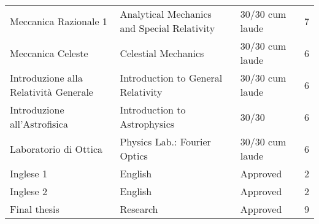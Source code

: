 \documentclass[a4paper,10pt,notitlepage]{paper}
\begin{document}
{\begin{tabular*}{\linewidth}{lll@{\hspace{0.7cm}}l@{\extracolsep{\fill}}}
Meccanica Razionale 1					&  Analytical Mechanics and Special Relativity& 30/30  cum laude &7\\	
Meccanica Celeste						&  Celestial Mechanics&  30/30  cum laude&6\\	
Introduzione alla Relatività Generale			&  Introduction to General Relativity& 30/30 cum laude &6\\	
Introduzione all'Astrofisica					&  Introduction to Astrophysics&  30/30 &6\\	
Laboratorio di Ottica						&  Physics Lab.: Fourier Optics&  30/30  cum laude&6\\	
Inglese 1								&  English & Approved  &2\\	
Inglese 2								&  English & Approved &2\\	
Final thesis						& Research  & Approved &  9\\
\end{tabular*}}
\end{document}
